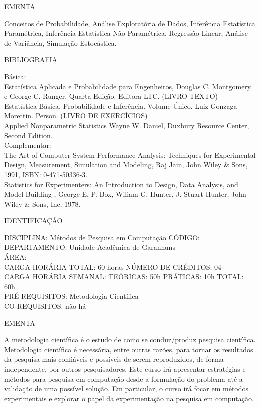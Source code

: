\documentclass[
	12pt,				%
	openright,			%
  oneside,     %
	a4paper,			%
	chapter=TITLE,		%
	english,			%
	french,				%
	spanish,			%
	brazil				%
	]{abntex2}
\begin{document}
\begin{apendicesenv}
EMENTA 

Conceitos de Probabilidade, Análise Exploratória de Dados, Inferência
Estatística Paramétrica, Inferência Estatística Não Paramétrica,
Regressão Linear, Análise de Variância, Simulação Estocástica.

BIBLIOGRAFIA 

Básica:\\
Estatística Aplicada e Probabilidade para Engenheiros, Douglas C.
Montgomery e George C. Runger. Quarta Edição. Editora LTC. (LIVRO
TEXTO) \\
Estatística Básica. Probabilidade e Inferência. Volume Único. Luiz
Gonzaga Morettin. Person. (LIVRO DE EXERCÍCIOS)\\
Applied Nonparametric Statistics  Wayne W. Daniel, Duxbury Resource
Center, Second Edition.\\
Complementar:\\
The Art of Computer System Performance Analysis: Techniques for
Experimental Design, Measurement, Simulation and Modeling, Raj Jain,
John Wiley \& Sons, 1991, ISBN: 0-471-50336-3. \\
Statistics for Experimenters: An Introduction to Design, Data Analysis,
and Model Building , George E. P. Box, Wiliam G. Hunter, J. Stuart
Hunter, John Wiley \& Sons, Inc. 1978.

\newpage IDENTIFICAÇÃO

DISCIPLINA: Métodos de Pesquisa em Computação CÓDIGO: \\
DEPARTAMENTO: Unidade Acadêmica de Garanhuns \\
ÁREA: \\
CARGA HORÁRIA TOTAL: 60 horas NÚMERO DE CRÉDITOS: 04\\
CARGA HORÁRIA SEMANAL: TEÓRICAS: 50h PRÁTICAS: 10h TOTAL: 60h\\
PRÉ-REQUISITOS: Metodologia Científica\\
CO-REQUISITOS: não há

EMENTA 

A metodologia científica é o estudo de como se conduz/produz pesquisa
científica. Metodologia científica é necessária, entre outras razões,
para tornar os resultados da pesquisa mais confiáveis e possíveis de
serem reproduzidos, de forma independente, por outros pesquisadores.
Este curso irá apresentar estratégias e métodos para pesquisa em
computação desde a formulação do problema até a validação de uma
possível solução. Em particular, o curso irá focar em métodos
experimentais e explorar o papel da experimentação na pesquisa em
computação.


\end{apendicesenv}
\end{document}
